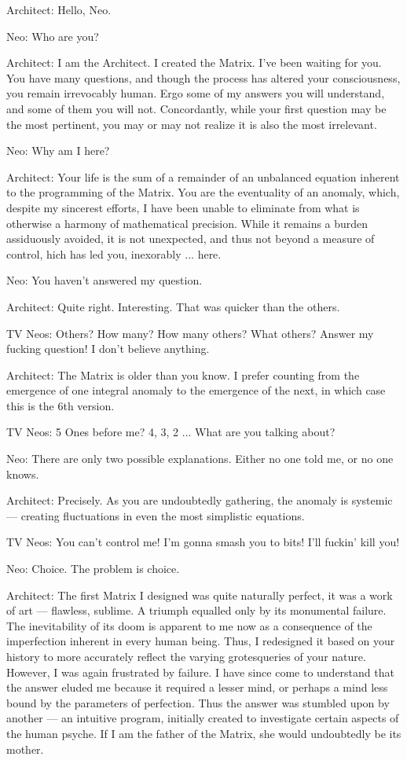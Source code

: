 \documentclass{ctexart}
\newenvironment{myquote}{\color{green} \setlength{\leftskip}{6em} \setlength{\rightskip}{4em} \setlength{\parindent}{-2em}}{\par}
\begin{document}
\begin{myquote}
Architect: Hello, Neo.

Neo: Who are you?

Architect: I am the Architect. I created the Matrix. I've been waiting for you. You have many questions, and though the process has altered your consciousness, you remain irrevocably human. Ergo some of my answers you will understand, and some of them you will not. Concordantly, while your first question may be the most pertinent, you may or may not realize it is also the most irrelevant.

Neo: Why am I here?

Architect: Your life is the sum of a remainder of an unbalanced equation inherent to the programming of the Matrix. You are the eventuality of an anomaly, which, despite my sincerest efforts, I have been unable to eliminate from what is otherwise a harmony of mathematical precision. While it remains a burden assiduously avoided, it is not unexpected, and thus not beyond a measure of control, hich has led you, inexorably ... here.

Neo: You haven't answered my question.

Architect: Quite right. Interesting. That was quicker than the others.

TV Neos: Others? How many? How many others? What others? Answer my fucking question! I don't believe anything.

Architect: The Matrix is older than you know. I prefer counting from the emergence of one integral anomaly to the emergence of the next, in which case this is the 6th version.

TV Neos: 5 Ones before me? 4, 3, 2 ... What are you talking about?

Neo: There are only two possible explanations. Either no one told me, or no one knows.

Architect: Precisely. As you are undoubtedly gathering, the anomaly is systemic --- creating fluctuations in even the most simplistic equations.

TV Neos: You can't control me! I'm gonna smash you to bits! I'll fuckin' kill you!

Neo: Choice. The problem is choice.

Architect: The first Matrix I designed was quite naturally perfect, it was a work of art --- flawless, sublime. A triumph equalled only by its monumental failure. The inevitability of its doom is apparent to me now as a consequence of the imperfection inherent in every human being. Thus, I redesigned it based on your history to more accurately reflect the varying grotesqueries of your nature. However, I was again frustrated by failure. I have since come to understand that the answer eluded me because it required a lesser mind, or perhaps a mind less bound by the parameters of perfection. Thus the answer was stumbled upon by another --- an intuitive program, initially created to investigate certain aspects of the human psyche. If I am the father of the Matrix, she would undoubtedly be its mother.


\end{myquote}
\end{document}
